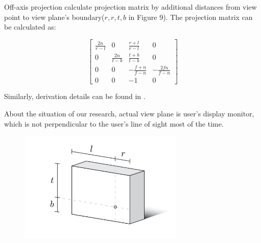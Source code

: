 Off-axis projection calculate projection matrix by additional distances from view point to view plane's boundary($r, r, t, b$ in Figure 9). The projection matrix can be calculated as:

\[
\begin{bmatrix}
\frac{2n}{r-l} & 0 & \frac{r+l}{r-l} & 0 \\
0 & \frac{2n}{t-b} & \frac{t+b}{t-b} & 0 \\
0 & 0 & -\frac{f+n}{f-n} & -\frac{2fn}{f-n} \\
0 & 0 & -1 & 0
\end{bmatrix}
\]

Similarly, derivation details can be found in \cite{Kooima2011GeneralizedPP}.

About the situation of our research, actual view plane is user's display monitor, which is not perpendicular to the user's line of sight most of the time.


\begin{figure}[htb]
    \centering
    \includegraphics[width=0.7\textwidth]{figures/Preliminaries/off-axis.png}
    \caption{}\label{Off-axis projection}
\end{figure}

\clearpage